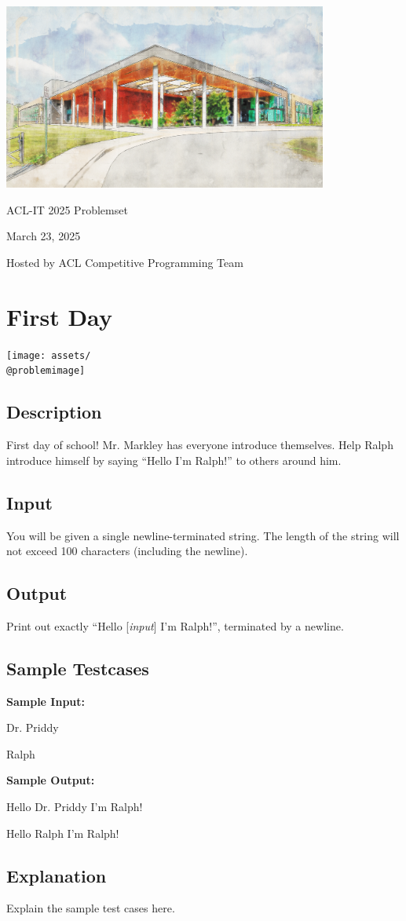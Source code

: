 \documentclass[12pt]{article}
\makeatletter
\newcommand{\testcase}[1]
{
  \let\@oldpar\par
  \def\par{\let\par\@oldpar \vspace{1ex}\hrule\vspace{1ex}}
  \ttfamily
  #1
}
\newenvironment{problem}
{%
  \newcommand{\problemtitle}[1]{\def\@problemtitle{##1}}
  \newcommand{\problemimage}[1]{\def\@problemimage{##1}}
  \newcommand{\problemdesc}[1]{\def\@problemdesc{##1}}
  \newcommand{\probleminput}[1]{\def\@probleminput{##1}}
  \newcommand{\problemoutput}[1]{\def\@problemoutput{##1}}
  \newcommand{\problemsamplein}[1]{\def\@problemsamplein{##1}}
  \newcommand{\problemsampleout}[1]{\def\@problemsampleout{##1}}
  \newcommand{\problemexplain}[1]{\def\@problemexplain{##1}}
  \def\@problemtitle{}
  \def\@problemimage{}
  \def\@problemdesc{}
  \def\@probleminput{}
  \def\@problemoutput{}
  \def\@problemsamplein{}
  \def\@problemsampleout{}
  \def\@problemexplain{}
}
{%
  \setlength\parindent{0pt}
  
  \section*{\@problemtitle}

  {\hfill\texttt{[image: assets/\\@problemimage]}\hfill}

  \subsection*{Description}
  \@problemdesc

  \subsection*{Input}
  \@probleminput

  \subsection*{Output}
  \@problemoutput

  \subsection*{Sample Testcases}
  \begin{multicols}{2}
    \textbf{Sample Input:}

    \testcase{\@problemsamplein}
    
    \columnbreak
    
    \textbf{Sample Output:}

    \testcase{\@problemsampleout}
  \end{multicols}

  \subsection*{Explanation}
  \@problemexplain
  
  \clearpage
}
\makeatother
\begin{document}
\begin{titlepage}
  \setlength\parskip{0.2cm}
  \centering
  
  \includegraphics[width=0.8\textwidth]{./assets/acl.png}
  
  {\Huge ACL-IT 2025 Problemset}
  
  {\Large March 23, 2025}

  Hosted by ACL Competitive Programming Team
  
\end{titlepage}

\begin{problem}
  \problemtitle{First Day}
  \problemimage{A.png}
  \problemdesc{
    First day of school! Mr. Markley has everyone introduce themselves. Help
    Ralph introduce himself by saying ``Hello I’m Ralph!'' to others around him.
  }
  \probleminput{
    You will be given a single newline-terminated string. The length of the
    string will not exceed 100 characters (including the newline).
  }
  \problemoutput{
    Print out exactly ``Hello [\emph{input}] I'm Ralph!'', terminated by a newline.
  }
  \problemsamplein{%
    Dr. Priddy
    
    Ralph
  }
  \problemsampleout{%
    Hello Dr. Priddy I'm Ralph!

    Hello Ralph I'm Ralph!
  }
  \problemexplain{Explain the sample test cases here.}
\end{problem}
\end{document}
